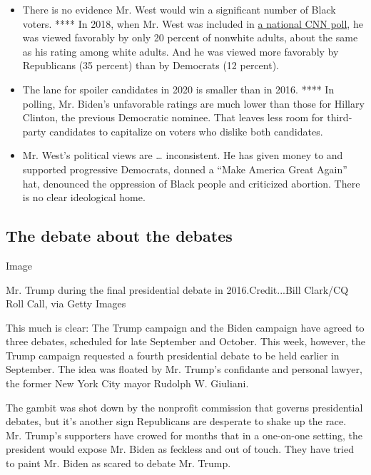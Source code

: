 \begin{itemize}
\item
  There is no evidence Mr. West would win a significant number of Black
  voters. **** In 2018, when Mr. West was included in
  \href{http://cdn.cnn.com/cnn/2018/images/05/11/rel5x.-.kanye.west.pdf}{a
  national CNN poll}, he was viewed favorably by only 20 percent of
  nonwhite adults, about the same as his rating among white adults. And
  he was viewed more favorably by Republicans (35 percent) than by
  Democrats (12 percent).
\item
  The lane for spoiler candidates in 2020 is smaller than in 2016. ****
  In polling, Mr. Biden's unfavorable ratings are much lower than those
  for Hillary Clinton, the previous Democratic nominee. That leaves less
  room for third-party candidates to capitalize on voters who dislike
  both candidates.
\item
  Mr. West's political views are \ldots{} inconsistent. He has given
  money to and supported progressive Democrats, donned a ``Make America
  Great Again'' hat, denounced the oppression of Black people and
  criticized abortion. There is no clear ideological home.
\end{itemize}

\hypertarget{the-debate-about-the-debates}{%
\subsection{The debate about the
debates}\label{the-debate-about-the-debates}}

Image

Mr. Trump during the final presidential debate in 2016.Credit...Bill
Clark/CQ Roll Call, via Getty Images

This much is clear: The Trump campaign and the Biden campaign have
agreed to three debates, scheduled for late September and October. This
week, however, the Trump campaign requested a fourth presidential debate
to be held earlier in September. The idea was floated by Mr. Trump's
confidante and personal lawyer, the former New York City mayor Rudolph
W. Giuliani.

The gambit was shot down by the nonprofit commission that governs
presidential debates, but it's another sign Republicans are desperate to
shake up the race. Mr. Trump's supporters have crowed for months that in
a one-on-one setting, the president would expose Mr. Biden as feckless
and out of touch. They have tried to paint Mr. Biden as scared to debate
Mr. Trump.

